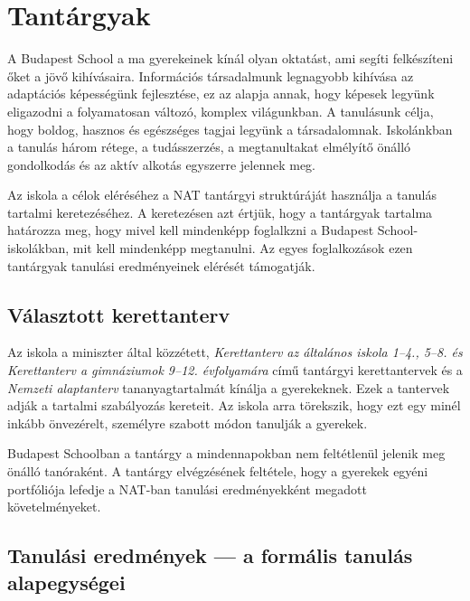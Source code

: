 \hypertarget{tantargyak}{%
\section{Tantárgyak}\label{tantargyak}}

A Budapest School a ma gyerekeinek kínál olyan oktatást, ami segíti
felkészíteni őket a jövő kihívásaira. Információs társadalmunk
legnagyobb kihívása az adaptációs képességünk fejlesztése, ez az alapja
annak, hogy képesek legyünk eligazodni a folyamatosan változó, komplex
világunkban. A tanulásunk célja, hogy boldog, hasznos és egészséges
tagjai legyünk a társadalomnak. Iskolánkban a tanulás három rétege, a
tudásszerzés, a megtanultakat elmélyítő önálló gondolkodás és az aktív
alkotás egyszerre jelennek meg.

Az iskola a célok eléréséhez a NAT tantárgyi struktúráját használja a
tanulás tartalmi keretezéséhez. A keretezésen azt értjük, hogy a
tantárgyak tartalma határozza meg, hogy mivel kell mindenképp foglalkzni a Budapest
School-iskolákban, mit kell mindenképp megtanulni. Az egyes
foglalkozások ezen tantárgyak tanulási eredményeinek elérését
támogatják.

\hypertarget{valasztott-kerettanterv}{%
\subsection{Választott kerettanterv}\label{valasztott-kerettanterv}}

Az iskola a miniszter által közzétett, \emph{Kerettanterv az általános
iskola 1--4., 5--8. és Kerettanterv a gimnáziumok 9--12. évfolyamára} című
tantárgyi kerettantervek {\autocite{Kerettanterv2020}} és a
\emph{Nemzeti alaptanterv} tananyagtartalmát kínálja a gyerekeknek.
Ezek a tantervek adják a tartalmi szabályozás kereteit. Az iskola arra
törekszik, hogy ezt egy minél inkább önvezérelt, személyre szabott
módon tanulják a gyerekek.

Budapest Schoolban a tantárgy a mindennapokban nem feltétlenül jelenik
meg önálló tanóraként. A tantárgy elvégzésének feltétele, hogy a
gyerekek egyéni portfóliója lefedje a NAT-ban tanulási eredményekként
megadott követelményeket.

\hypertarget{tanulasi-eredmenyek-a-formalis-tanulas-alapegysegei}{%
\subsection{Tanulási eredmények --- a formális tanulás
alapegységei}\label{tanulasi-eredmenyek-a-formalis-tanulas-alapegysegei}}

